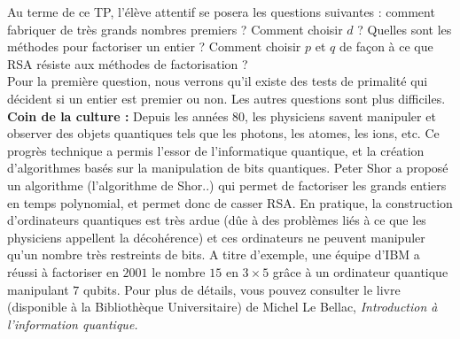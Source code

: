 Au terme de ce TP, l'élève attentif se posera les questions suivantes : comment fabriquer de très grands nombres premiers ? Comment choisir $d$ ? Quelles sont les méthodes pour factoriser un entier ? Comment choisir $p$ et $q$ de façon à ce que RSA résiste aux méthodes de factorisation ?\\

Pour la première question, nous verrons qu'il existe des tests de primalité qui décident si un entier est premier ou non. Les autres questions sont plus difficiles. \textbf{Coin de la culture :} Depuis les années $80$, les physiciens savent manipuler et observer des objets quantiques tels que les photons, les atomes, les ions, etc. Ce progrès technique a permis l'essor de l'informatique quantique, et la création d'algorithmes basés sur la manipulation de bits quantiques. Peter Shor a proposé un algorithme (l'algorithme de Shor..) qui permet de factoriser les grands entiers en temps polynomial, et permet donc de casser RSA. En pratique, la construction d'ordinateurs quantiques est très ardue (dûe à des problèmes liés à ce que les physiciens appellent la décohérence) et ces ordinateurs ne peuvent manipuler qu'un nombre très restreints de bits. A titre d'exemple, une équipe d'IBM a réussi à factoriser en $2001$ le nombre $15$ en $ 3 \times 5$ grâce à un ordinateur quantique manipulant $7$ qubits. Pour plus de détails, vous pouvez consulter le livre (disponible à la Bibliothèque Universitaire) de Michel Le Bellac, \textit{Introduction à l'information quantique.}
 